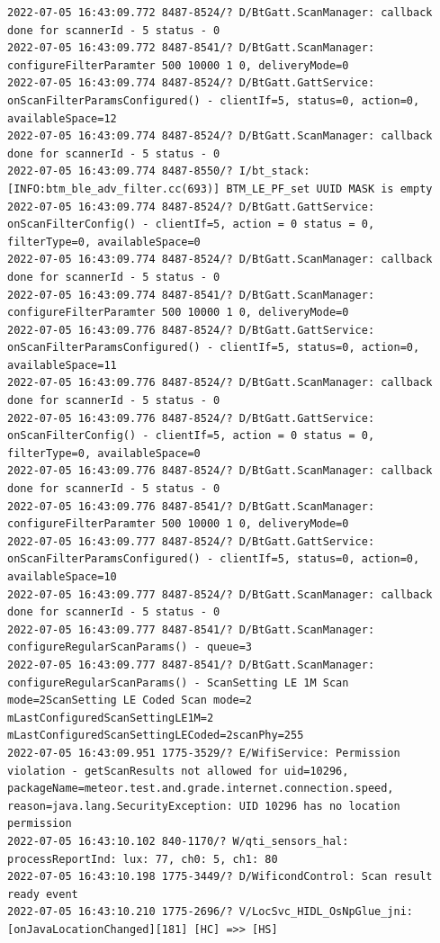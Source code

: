 \documentclass[a4paper,12pt]{book}
\begin{document}
\begin{lstlisting}
2022-07-05 16:43:09.772 8487-8524/? D/BtGatt.ScanManager: callback done for scannerId - 5 status - 0
2022-07-05 16:43:09.772 8487-8541/? D/BtGatt.ScanManager: configureFilterParamter 500 10000 1 0, deliveryMode=0
2022-07-05 16:43:09.774 8487-8524/? D/BtGatt.GattService: onScanFilterParamsConfigured() - clientIf=5, status=0, action=0, availableSpace=12
2022-07-05 16:43:09.774 8487-8524/? D/BtGatt.ScanManager: callback done for scannerId - 5 status - 0
2022-07-05 16:43:09.774 8487-8550/? I/bt_stack: [INFO:btm_ble_adv_filter.cc(693)] BTM_LE_PF_set UUID MASK is empty 
2022-07-05 16:43:09.774 8487-8524/? D/BtGatt.GattService: onScanFilterConfig() - clientIf=5, action = 0 status = 0, filterType=0, availableSpace=0
2022-07-05 16:43:09.774 8487-8524/? D/BtGatt.ScanManager: callback done for scannerId - 5 status - 0
2022-07-05 16:43:09.774 8487-8541/? D/BtGatt.ScanManager: configureFilterParamter 500 10000 1 0, deliveryMode=0
2022-07-05 16:43:09.776 8487-8524/? D/BtGatt.GattService: onScanFilterParamsConfigured() - clientIf=5, status=0, action=0, availableSpace=11
2022-07-05 16:43:09.776 8487-8524/? D/BtGatt.ScanManager: callback done for scannerId - 5 status - 0
2022-07-05 16:43:09.776 8487-8524/? D/BtGatt.GattService: onScanFilterConfig() - clientIf=5, action = 0 status = 0, filterType=0, availableSpace=0
2022-07-05 16:43:09.776 8487-8524/? D/BtGatt.ScanManager: callback done for scannerId - 5 status - 0
2022-07-05 16:43:09.776 8487-8541/? D/BtGatt.ScanManager: configureFilterParamter 500 10000 1 0, deliveryMode=0
2022-07-05 16:43:09.777 8487-8524/? D/BtGatt.GattService: onScanFilterParamsConfigured() - clientIf=5, status=0, action=0, availableSpace=10
2022-07-05 16:43:09.777 8487-8524/? D/BtGatt.ScanManager: callback done for scannerId - 5 status - 0
2022-07-05 16:43:09.777 8487-8541/? D/BtGatt.ScanManager: configureRegularScanParams() - queue=3
2022-07-05 16:43:09.777 8487-8541/? D/BtGatt.ScanManager: configureRegularScanParams() - ScanSetting LE 1M Scan mode=2ScanSetting LE Coded Scan mode=2 mLastConfiguredScanSettingLE1M=2 mLastConfiguredScanSettingLECoded=2scanPhy=255
2022-07-05 16:43:09.951 1775-3529/? E/WifiService: Permission violation - getScanResults not allowed for uid=10296, packageName=meteor.test.and.grade.internet.connection.speed, reason=java.lang.SecurityException: UID 10296 has no location permission
2022-07-05 16:43:10.102 840-1170/? W/qti_sensors_hal: processReportInd: lux: 77, ch0: 5, ch1: 80
2022-07-05 16:43:10.198 1775-3449/? D/WificondControl: Scan result ready event
2022-07-05 16:43:10.210 1775-2696/? V/LocSvc_HIDL_OsNpGlue_jni: [onJavaLocationChanged][181] [HC] =>> [HS]

\end{lstlisting}
\end{document}
